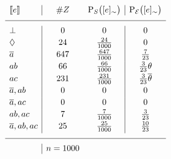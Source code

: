 \documentclass[a4paper]{article}
\newcommand{\at}[1]{\ensuremath{\!\del{#1}}}        %
\newcommand{\cla}[1]{\ensuremath{{\cal #1}}}        %
\newcommand{\co}[1]{\ensuremath{\overline{#1}}}     %
\newcommand{\EVENTSset}{\ensuremath{\cla{E}}}
\newcommand{\prfunc}{\ensuremath{\mathrm{P}}}
\newcommand{\prd}[1]{\ensuremath{\prfunc_{#1}}}
\newcommand{\prE}{\prd{\EVENTSset}}
\newcommand{\stablecore}[1]{\ensuremath{\left\llbracket #1 \right\rrbracket}}
\newcommand{\inconsistent}{\bot}
\newcommand{\indepclass}{\ensuremath{\Diamond}}
\newcommand{\class}[1]{\ensuremath{[{#1}]_{\sim}}}
\begin{document}
\begin{table}[t]
    \begin{center}
        \[
            \begin{array}{l|cc|c}
                \stablecore{e}
                 & \#Z
                 & \prd{S}\at{\class{e}}
                 & \prE\at{\class{e}}
                \\
                \hline
                \inconsistent
                 & 0
                 & 0
                 & 0                       \\[2pt]
                \indepclass
                 & 24
                 & \frac{24}{1000}
                 & 0                       \\[2pt]
                \co{a}
                 & 647
                 & \frac{647}{1000}
                 & \frac{7}{23}
                \\[2pt]
                ab
                 & 66
                 & \frac{66}{1000}
                 & \frac{3}{23}\theta      \\[2pt]
                ac
                 & 231
                 & \frac{231}{1000}
                 & \frac{3}{23}\co{\theta}
                \\[2pt]
                \co{a}, ab
                 & 0
                 & 0
                 & 0                       \\[2pt]
                \co{a}, ac
                 & 0
                 & 0
                 & 0
                \\[2pt]
                ab, ac
                 & 7
                 & \frac{7}{1000}
                 & \frac{3}{23}
                \\[2pt]
                \co{a}, ab, ac
                 & 25
                 & \frac{25}{1000}
                 & \frac{10}{23}
                \\[2pt]
                \hline
                 & n = 1000\end{array}
        \]
    \end{center}

    \caption{\emph{Experiment 1: Bias to \(ac\).} Results from an 
    experiment where \(n=1000\) samples where generated following 
    the \emph{Model+Noise} procedure with parameters 
    \(\alpha = 0.1, \beta = 0.3, \gamma = 0.2\).  
    Column \(\#Z\) lists the number of observations on each class, 
    the \emph{empirical} distribution is represented by \(\prd{S}\) 
    and the \emph{prior}, as before, is denoted by \(\prE\).}
    \label{tab:sbf.example}
\end{table}
\end{document}
